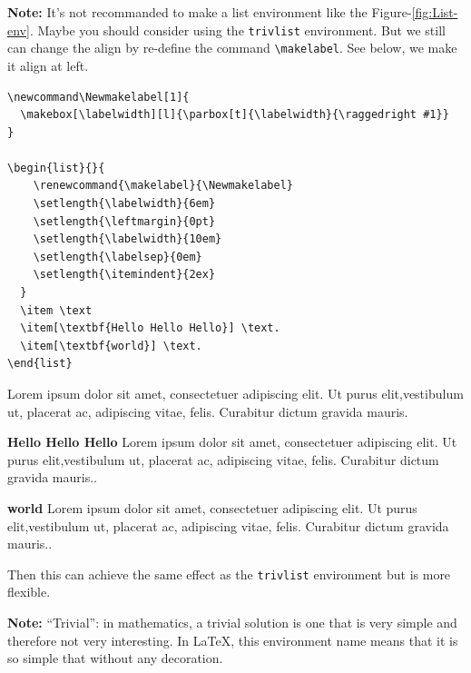 \documentclass[draft]{article}
\def\text{Lorem ipsum dolor sit amet, consectetuer adipiscing elit.%
Ut purus elit,vestib\-ulum ut, placerat ac, adipiscing vitae, felis. Curabitur dictum gravida%
mauris.}
\begin{document}
\textbf{Note:} It's not recommanded to  make a list environment like the Figure-\ref{fig:List-env}. Maybe you should consider using 
the \texttt{trivlist} environment. But we still can change the align by re-define the command \verb|\makelabel|. See below, we make it 
align at left.
\begin{verbatim}
\newcommand\Newmakelabel[1]{
  \makebox[\labelwidth][l]{\parbox[t]{\labelwidth}{\raggedright #1}}
}

\begin{list}{}{
    \renewcommand{\makelabel}{\Newmakelabel}
    \setlength{\labelwidth}{6em}
    \setlength{\leftmargin}{0pt}
    \setlength{\labelwidth}{10em}
    \setlength{\labelsep}{0em}
    \setlength{\itemindent}{2ex}
  }
  \item \text
  \item[\textbf{Hello Hello Hello}] \text.
  \item[\textbf{world}] \text.
\end{list}
\end{verbatim}

\newcommand\Newmakelabel[1]{
  \makebox[\labelwidth][l]{\parbox[t]{\labelwidth}{\raggedright #1}}
}

\begin{list}{}{
    \renewcommand{\makelabel}{\Newmakelabel}
    \setlength{\labelwidth}{6em}
    \setlength{\leftmargin}{0pt}
    \setlength{\labelwidth}{10em}
    \setlength{\labelsep}{0em}
    \setlength{\itemindent}{2ex}
  }
  \item \text
  \item[\textbf{Hello Hello Hello}] \text.
  \item[\textbf{world}] \text.
\end{list}

Then this can achieve the same effect as the \texttt{trivlist} environment but is more flexible.

\textbf{Note:}  ``Trivial'': in mathematics, a trivial solution is one that is very simple and therefore not very interesting.
In \LaTeX{}, this environment name means that it is so simple that without any decoration.
\end{document}

